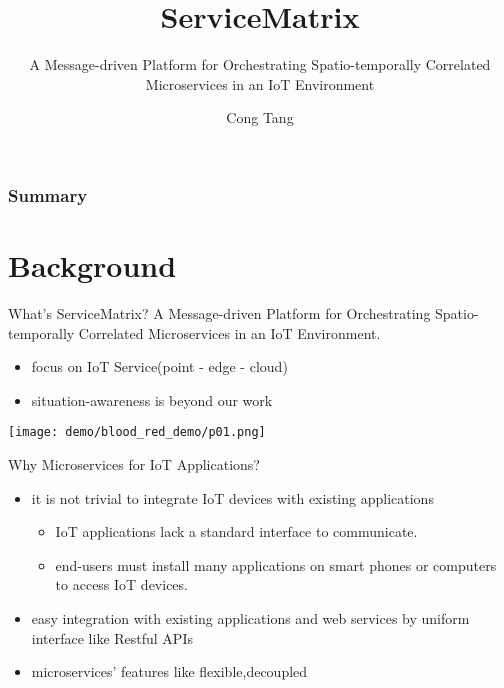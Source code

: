 \documentclass[notheorems, aspectratio=54]{beamer}
\title[ServiceMatrix]{ServiceMatrix}
\subtitle{ A Message-driven Platform for Orchestrating Spatio-temporally Correlated Microservices in an IoT Environment}
\author{Cong Tang}
\institute[I2EC]{I2EC@ICS}
\begin{document}
\begin{frame}
    \titlepage
\end{frame}


\begin{frame}
    \frametitle{Summary}
    \tableofcontents
\end{frame}

\section{Background}
\begin{frame}{What's ServiceMatrix?}
    A \alert{Message-driven Platform} for \alert{Orchestrating Spatio-temporally Correlated Microservices} in an \alert{IoT} Environment.
    \begin{itemize}
    \item focus on IoT Service(point - \alert{edge} - \alert{cloud})
    \item situation-awareness is beyond our work
    \end{itemize}
    \texttt{[image: demo/blood\_red\_demo/p01.png]}
\end{frame}

\begin{frame}{Why Microservices for IoT Applications?}
    \begin{itemize}
        \item  it is not trivial to integrate IoT devices with existing applications
        \begin{itemize}
            \item IoT applications lack a standard interface to communicate.
            \item end-users must install many applications on smart phones or computers to access IoT devices.
        \end{itemize}
        \item easy integration with existing applications and web services by uniform interface like Restful APIs 
        \item microservices' features like flexible,decoupled
    \end{itemize}
\end{frame}
\end{document}
